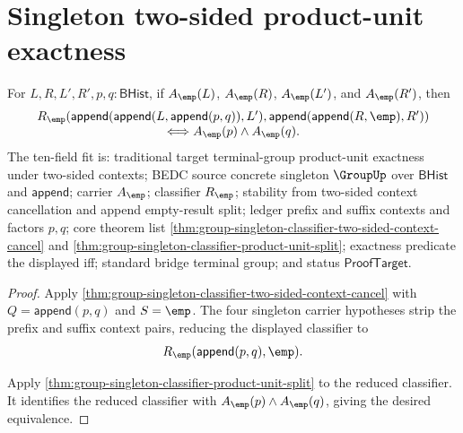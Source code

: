 \section{Singleton two-sided product-unit exactness}
\label{sec:group-singleton-two-sided-product-unit-exactness}

\begin{theorem}
\label{thm:group-singleton-two-sided-contextual-product-unit-split}
For $L,R,L',R',p,q:\mathsf{BHist}$, if $A_{\emp}(L)$, $A_{\emp}(R)$,
$A_{\emp}(L')$, and $A_{\emp}(R')$, then
$$
\begin{array}{c}
R_{\emp}(\mathsf{append}(\mathsf{append}(L,\mathsf{append}(p,q)),L'),
\mathsf{append}(\mathsf{append}(R,\emp),R'))\\
\Longleftrightarrow A_{\emp}(p)\land A_{\emp}(q).
\end{array}
$$
The ten-field fit is: traditional target terminal-group product-unit exactness
under two-sided contexts; BEDC source concrete singleton $\GroupUp$ over
$\mathsf{BHist}$ and $\mathsf{append}$; carrier $A_{\emp}$; classifier
$R_{\emp}$; stability from two-sided context cancellation and append
empty-result split; ledger prefix and suffix contexts and factors $p,q$; core
theorem list
\autoref{thm:group-singleton-classifier-two-sided-context-cancel} and
\autoref{thm:group-singleton-classifier-product-unit-split}; exactness
predicate the displayed iff; standard bridge terminal group; and status
$\mathsf{ProofTarget}$.
\end{theorem}
\begin{proof}
Apply \autoref{thm:group-singleton-classifier-two-sided-context-cancel} with
$Q=\mathsf{append}(p,q)$ and $S=\emp$. The four singleton carrier hypotheses
strip the prefix and suffix context pairs, reducing the displayed classifier to
$$
R_{\emp}(\mathsf{append}(p,q),\emp).
$$

Apply \autoref{thm:group-singleton-classifier-product-unit-split} to the
reduced classifier. It identifies the reduced classifier with
$A_{\emp}(p)\land A_{\emp}(q)$, giving the desired equivalence.
\end{proof}


